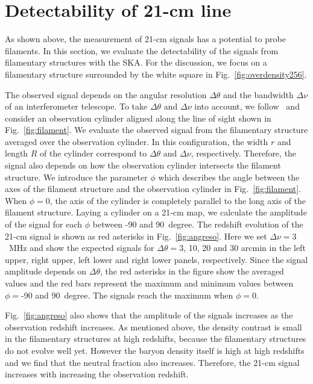 \documentclass[a4paper,fleqn,usenatbib,useAMS]{mnras}
\begin{document}
\section{Detectability of  21-cm line}\label{Detectability of HI 21-cm line} 

As shown above, the measurement of 21-cm signals has a potential to probe filaments. 
In this section, we evaluate the detectability of the signals from
filamentary structures with the SKA. 
For the discussion, we focus on a filamentary structure surrounded by the white square in Fig.~\ref{fig:overdensity256}.

The observed signal depends on the angular resolution $\Delta \theta$ and the
bandwidth $\Delta \nu$ of an interferometer telescope.
To take $\Delta \theta$ and $\Delta \nu$ into account, we follow~\citet{Takeuchi2014} and consider an observation cylinder aligned along the line of sight shown in Fig.~\ref{fig:filament}.
We evaluate the observed signal from the filamentary structure averaged over the observation cylinder. 
In this configuration, the width $r$ and length $R$ of the cylinder correspond to
$\Delta \theta$ and $\Delta \nu$, respectively. 
Therefore, the signal also depends on how the observation cylinder intersects the
filament structure. We introduce the parameter $\phi$ which describes
the angle between the axes of the filament structure and the observation cylinder in Fig.~\ref{fig:filament}.
When $\phi =0$, the axis of the cylinder is completely parallel to
the long axis of the filament structure.
Laying a cylinder on a 21-cm map, we calculate the amplitude of the signal for each $\phi$ between -90 and 90~degree.
The redshift evolution of the 21-cm signal is shown as red asterisks in Fig.~\ref{fig:angreso}.
Here we set $\Delta \nu =3$~MHz and show the expected signals for $\Delta \theta =$3, 10, 20 and 30 arcmin in the left upper, right upper, left lower and right lower panels, respectively.
Since the signal amplitude depends on $\Delta \theta$, the red asterisks in the figure show the averaged values and the red bars represent the maximum and minimum values between $\phi=$-90 and 90~degree. 
The signals reach the maximum when $\phi = 0$.

Fig.~\ref{fig:angreso} also shows that the amplitude of the signals increases as the observation redshift increases. 
As mentioned above, the density contrast is small in the filamentary structures at high redshifts, because the filamentary structures do not evolve well yet. 
However the baryon density itself is high at high redshifts and we find that the neutral fraction also increases. Therefore, the 21-cm signal increases with increasing the observation redshift. 
\end{document}
